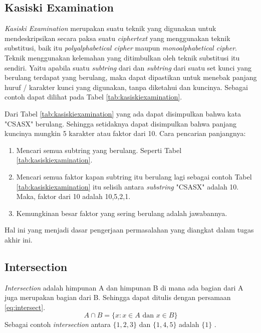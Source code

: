 	 \subsection{Kasiski Examination}
	 \textit{Kasiski Examination} merupakan suatu teknik yang digunakan untuk mendeskripsikan secara paksa suatu \textit{ciphertext} yang menggunakan teknik substitusi, baik itu \textit{polyalphabetical cipher} maupun \textit{monoalphabetical cipher}. Teknik menggunakan kelemahan yang ditimbulkan oleh teknik substitusi itu sendiri. Yaitu apabila suatu \textit{subtring} dari \plaintext dan \textit{subtring} dari suatu set kunci yang berulang terdapat yang berulang, maka dapat dipastikan untuk menebak panjang huruf / karakter kunci yang digunakan, tanpa diketahui \plaintext dan kuncinya. Sebagai contoh dapat dilihat pada Tabel \ref{tab:kasiskiexamination}.
	 \begin{table}[H]
	 	\caption{Contoh \textit{Kasiski Examintaion}}
		\label{tab:kasiskiexamination}
	\end{table}
	Dari Tabel \ref{tab:kasiskiexamination} yang ada dapat disimpulkan bahwa kata "CSASX" berulang. Sehingga setidaknya dapat disimpulkan bahwa panjang kuncinya mungkin 5 karakter atau faktor dari 10\cite{noauthor_kasiski_nodate}.
	Cara pencarian panjangnya:
	\begin{enumerate}
	\item Mencari semua subtring yang berulang. Seperti Tabel \ref{tab:kasiskiexamination}.
	\item Mencari semua faktor kapan subtring itu berulang lagi sebagai contoh Tabel \ref{tab:kasiskiexamination} itu selisih antara \textit{substring} "CSASX" adalah 10. Maka, faktor dari 10 adalah 10,5,2,1. 
	\item Kemungkinan besar faktor yang sering berulang adalah jawabannya. 
	\end{enumerate}
	 Hal ini yang menjadi dasar pengerjaan permasalahan yang diangkat dalam tugas akhir ini.
 
	\subsection{Intersection}
	\textit{Intersection} adalah himpunan A dan himpunan B di mana ada bagian dari A juga merupakan bagian dari B. Sehingga dapat ditulis dengan persamaan \ref{eq:intersect}.
	\begin{equation}
	\label{eq:intersect}
	A\cap{B=\{x:x\in A \textrm{ dan } x \in B \}}
	\end{equation}
	Sebagai contoh \textit{intersection} antara $\{1,2,3\}$ dan $\{1,4,5\}$ adalah $\{1\}$\cite{devlin_joy_1993}	.
	
